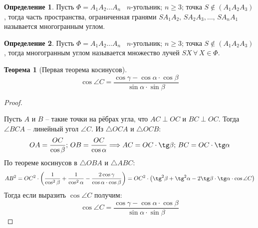 \documentclass[12pt]{article}
\theoremstyle{definition}
\newtheorem{theorem}{Теорема}[section]
\newtheorem{definition}{Определение}
\begin{document}
\begin{definition}
    Пусть $\Phi=A_1A_2\ldots A_n$ \textemdash\, $n$-угольник; $n\geq3$; точка $S\notin (A_1A_2A_3)$, тогда часть пространства, ограниченная гранями $SA_1A_2,\,SA_2A_3,\ldots,\,SA_nA_1$ называется многогранным углом. 
\end{definition}
\begin{definition}
    Пусть $\Phi=A_1A_2\ldots A_n$ \textemdash\, $n$-угольник; $n\geq3$; точка $S\notin (A_1A_2A_3)$, тогда многогранным углом называется множество лучей $SX\,\forall\,X\in\Phi$.
\end{definition}
\begin{theorem}[Первая теорема косинусов]
    $$\cos\angle C=\frac{\cos\gamma-\cos\alpha\cdot\cos\beta}{\sin\alpha\cdot\sin\beta}$$
\end{theorem}
\begin{proof}
    $ $\par\nobreak\ignorespaces
    \begin{center}
    \end{center}
    Пусть $A$ и $B$ – такие точки на рёбрах угла, что $AC\perp OC$ и $BC\perp OC$. Тогда $\angle BCA$ – линейный угол $\angle C$. Из $\triangle OCA$ и $\triangle OCB$:
    $$OA=\frac{OC}{\cos\beta};\,OB=\frac{OC}{\cos\alpha}\Longrightarrow AC=OC\cdot\tg \beta;\,BC=OC\cdot\tg \alpha$$
    По теореме косинусов в $\triangle OBA$ и $\triangle ABC$:
    $$AB^2=OC^2\cdot\left(\frac{1}{\cos^2\beta}+\frac{1}{\cos^2\alpha}-\frac{2\cos\gamma}{\cos\alpha\cdot\cos\beta}\right)=OC^2\cdot\left(\tg^2 \beta+\tg^2 \alpha -2\tg \beta \cdot \tg \alpha \cdot\cos \angle C\right)$$
    Тогда если выразить $\cos\angle C$ получим:
    $$\cos\angle C=\frac{\cos\gamma-\cos\alpha\cdot\cos\beta}{\sin\alpha\cdot\sin\beta}$$
\end{proof}
\end{document}
